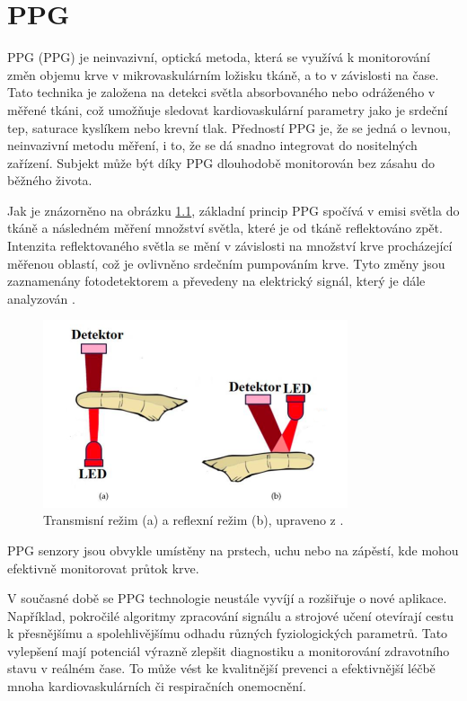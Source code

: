 \chapter{\acl{PPG}}

\acl{PPG} (\acs{PPG}) je neinvazivní, optická metoda, která se využívá k monitorování změn objemu krve v mikrovaskulárním ložisku tkáně, a to v závislosti na čase.
Tato technika je založena na detekci světla absorbovaného nebo odráženého v měřené tkáni, což umožňuje sledovat kardiovaskulární parametry jako je srdeční tep, saturace kyslíkem nebo krevní tlak.
Předností \acs{PPG} je, že se jedná o levnou, neinvazivní metodu měření, i to, že se dá snadno integrovat do nositelných zařízení.
Subjekt může být díky \acs{PPG} dlouhodobě monitorován bez zásahu do běžného života.

Jak je znázorněno na obrázku \ref{fig:snimaniPPG}, základní princip \acs{PPG} spočívá v emisi světla do tkáně a následném měření množství světla, které je od tkáně reflektováno zpět.
Intenzita reflektovaného světla se mění v závislosti na množství krve procházející měřenou oblastí, což je ovlivněno srdečním pumpováním krve.
Tyto změny jsou zaznamenány fotodetektorem a převedeny na elektrický signál, který je dále analyzován \cite{Park2022}.

\begin{figure}[h]
	\centering
	\includegraphics[width=0.8\textwidth]{./obrazky/snimaniPPG.png}
	\caption[Snímání PPG signálu]{Transmisní režim (a) a reflexní režim (b), upraveno z \cite{ENIKÖ}.}
	\label{fig:snimaniPPG}
\end{figure}

\acs{PPG} senzory jsou obvykle umístěny na prstech, uchu nebo na zápěstí, kde mohou efektivně monitorovat průtok krve.

V současné době se \acs{PPG} technologie neustále vyvíjí a rozšiřuje o nové aplikace.
Například, pokročilé algoritmy zpracování signálu a strojové učení otevírají cestu k přesnějšímu a spolehlivějšímu odhadu různých fyziologických parametrů.
Tato vylepšení mají potenciál výrazně zlepšit diagnostiku a monitorování zdravotního stavu v reálném čase.
To může vést ke kvalitnější prevenci a efektivnější léčbě mnoha kardiovaskulárních či respiračních onemocnění.

